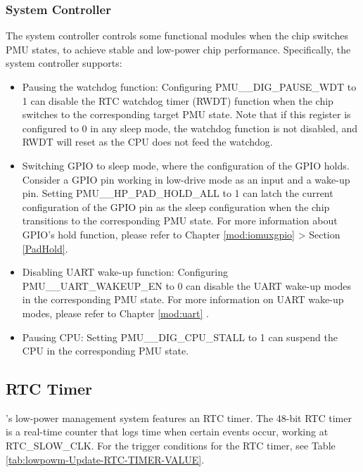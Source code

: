 \documentclass[main\_\_EN.tex]{subfiles}
\begin{document}
\subsubsection{System Controller}

The system controller controls some functional modules when the chip switches PMU states, to achieve stable and low-power chip performance. Specifically, the system controller supports:

\begin{itemize}
    \item Pausing the watchdog function: Configuring PMU\_\_DIG\_PAUSE\_WDT to 1 can disable the RTC watchdog timer (RWDT) function when the chip switches to the corresponding target PMU state. Note that if this register is configured to 0 in any sleep mode, the watchdog function is not disabled, and RWDT will reset as the CPU does not feed the watchdog.

    \item Switching GPIO to sleep mode, where the configuration of the GPIO holds. Consider a GPIO pin working in low-drive mode as an input and a wake-up pin. Setting PMU\_\_HP\_PAD\_HOLD\_ALL to 1 can latch the current configuration of the GPIO pin as the sleep configuration when the chip transitions to the corresponding PMU state. For more information about GPIO's hold function, please refer to Chapter \ref{mod:iomuxgpio} \textit{} > Section \ref{PadHold}.

    \item Disabling UART wake-up function: Configuring PMU\_\_UART\_WAKEUP\_EN to 0 can disable the UART wake-up modes in the corresponding PMU state. For more information on UART wake-up modes, please refer to Chapter \ref{mod:uart} \textit{}.

    \item Pausing CPU: Setting PMU\_\_DIG\_CPU\_STALL to 1 can suspend the CPU in the corresponding PMU state.
\end{itemize}

\subsection{RTC Timer}

\chipname{}'s low-power management system features an RTC timer. The 48-bit RTC timer is a real-time counter that logs time when certain events occur, working at RTC\_SLOW\_CLK. For the trigger conditions for the RTC timer, see Table \ref{tab:lowpowm-Update-RTC-TIMER-VALUE}.
\end{document}
